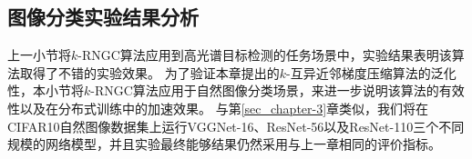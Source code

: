 \documentclass{xdupgthesis}
\begin{document}
\subsection{图像分类实验结果分析}
上一小节将$k$-RNGC算法应用到高光谱目标检测的任务场景中，实验结果表明该算法取得了不错的实验效果。
为了验证本章提出的$k$-互异近邻梯度压缩算法的泛化性，本小节将$k$-RNGC算法应用于自然图像分类场景，来进一步说明该算法的有效性以及在分布式训练中的加速效果。
与第\ref*{sec_chapter-3}章类似，我们将在CIFAR10自然图像数据集上运行VGGNet-16、ResNet-56以及ResNet-110三个不同规模的网络模型，并且实验最终能够结果仍然采用与上一章相同的评价指标。

\begin{figure}[H]
    \centering
\end{figure}
\end{document}

